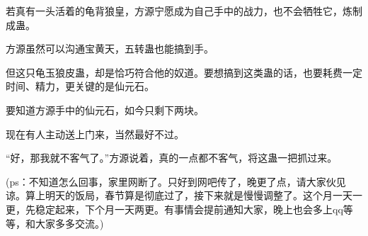 \begin{this_body}
若真有一头活着的龟背狼皇，方源宁愿成为自己手中的战力，也不会牺牲它，炼制成蛊。

方源虽然可以沟通宝黄天，五转蛊也能搞到手。

但这只龟玉狼皮蛊，却是恰巧符合他的奴道。要想搞到这类蛊的话，也要耗费一定时间、精力，更关键的是仙元石。

要知道方源手中的仙元石，如今只剩下两块。

现在有人主动送上门来，当然最好不过。

“好，那我就不客气了。”方源说着，真的一点都不客气，将这蛊一把抓过来。

(ps：不知道怎么回事，家里网断了。只好到网吧传了，晚更了点，请大家伙见谅。算上明天的饭局，春节算是彻底过了，接下来就是慢慢调整了。这个月一天一更，先稳定起来，下个月一天两更。有事情会提前通知大家，晚上也会多上qq等等，和大家多多交流。)

\end{this_body}

